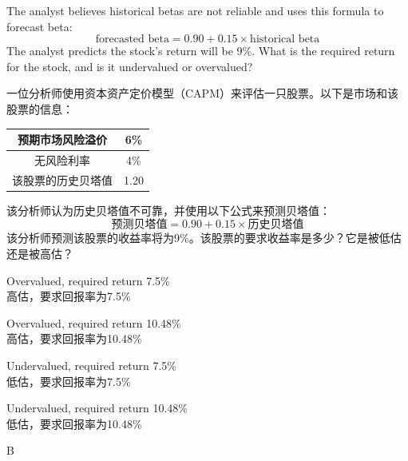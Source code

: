 \documentclass{article}
\begin{document}
The analyst believes historical betas are not reliable and uses this formula to forecast beta: 
\[
\text{forecasted beta} = 0.90 + 0.15 \times \text{historical beta}
\]
The analyst predicts the stock's return will be 9\%. What is the required return for the stock, and is it undervalued or overvalued?


    一位分析师使用资本资产定价模型（CAPM）来评估一只股票。以下是市场和该股票的信息：


\begin{table}[H]
    \centering
    \begin{tabular}{|c|c|}
        \hline
        预期市场风险溢价 & 6\% \\
        \hline
        无风险利率 & 4\% \\
        \hline
        该股票的历史贝塔值 & 1.20 \\
        \hline
    \end{tabular}
\end{table}

该分析师认为历史贝塔值不可靠，并使用以下公式来预测贝塔值： 
\[
\text{预测贝塔值} = 0.90 + 0.15 \times \text{历史贝塔值}
\]
该分析师预测该股票的收益率将为9\%。该股票的要求收益率是多少？它是被低估还是被高估？
\begin{choices}
    \item Overvalued, required return 7.5\%
    \\
    高估，要求回报率为7.5\%
    \item Overvalued, required return 10.48\%
    \\
    高估，要求回报率为10.48\%
    \item Undervalued, required return 7.5\%
    \\
    低估，要求回报率为7.5\%
    \item Undervalued, required return 10.48\%
    \\
    低估，要求回报率为10.48\%
\end{choices}

\begin{correctanswer}
    B
\end{correctanswer}
\end{document}
